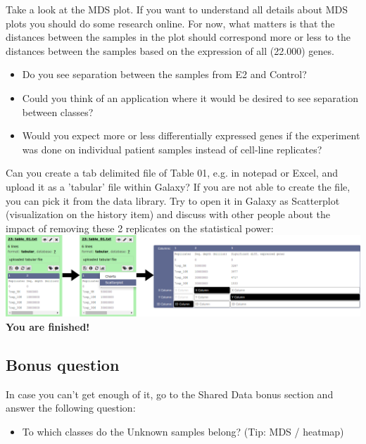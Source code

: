 Take a look at the MDS plot. If you want to understand all details about MDS plots you should do some research online. For now, what matters is that the distances between the samples in the plot should correspond more or less to the distances between the samples based on the expression of all (22.000) genes.
\begin{itemize}
	\item Do you see separation between the samples from E2 and Control?
	\item Could you think of an application where it would be desired to see separation between classes?
	\item Would you expect more or less differentially expressed genes if the experiment was done on individual patient samples instead of cell-line replicates?
\end{itemize}
Can you create a tab delimited file of Table 01, e.g. in notepad or Excel, and upload it as a 'tabular' file within Galaxy? If you are not able to create the file, you can pick it from the data library. Try to open it in Galaxy as Scatterplot (visualization on the history item) and discuss with other people about the impact of removing these 2 replicates on the statistical power:\\
\includegraphics[width=\textwidth]{figures/expression_04.png}\\
\textbf{You are finished!}
\subsection{Bonus question}
In case you can't get enough of it, go to the Shared Data bonus section and answer the following question:
\begin{itemize}
	\item To which classes do the Unknown samples belong? (Tip: MDS / heatmap)
\end{itemize}
